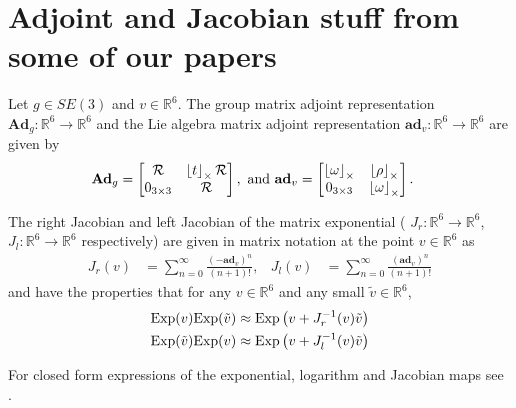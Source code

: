 \section{Adjoint and Jacobian stuff from some of our papers}

Let $g \in SE(3)$ and $v \in \mathbb{R}^6$. The group matrix adjoint representation $\mathbf{Ad}_{g}:\mathbb{R}^6 \to \mathbb{R}^6$ and the Lie algebra matrix adjoint representation $\mathbf{ad}_{v}:\mathbb{R}^{6}\to\mathbb{R}^{6}$ are given by 
\begin{align*}
\mathbf{Ad}_{g}&=\begin{bmatrix}\mathcal{R} & \ss{t}\mathcal{R}\\
0_{3\times3} & \mathcal{R}
\end{bmatrix}, \text{ and } \mathbf{ad}_{v}=\begin{bmatrix}\ss{\omega} & \ss{\rho}\\
0_{3\times3} & \ss{\omega}
\end{bmatrix}.
\end{align*}

The right Jacobian and left Jacobian of the matrix exponential (
$J_{r}:\mathbb{R}^{6}\to\mathbb{R}^{6}$, $J_{l}:\mathbb{R}^{6}\to\mathbb{R}^{6}$ respectively) are given
in matrix notation at the point $v \in{\mathbb{R}^6}$ as 
\begin{align} \label{eq:exponential_jacobians}
J_{r}\left(v\right) & =\sum_{n=0}^{\infty}\frac{\left(-\mathbf{ad}_{v}\right)^{n}}{\left(n+1\right)!}, & J_{l}\left(v\right) & =\sum_{n=0}^{\infty}\frac{\left(\mathbf{ad}_{v}\right)^{n}}{\left(n+1\right)!}
\end{align}
and have the properties that for any $v\in\mathbb{R}^6$ and any small $\tilde{v}\in\mathbb{R}^6$, 
\begin{subequations}\label{eq:Jacobian_property}
\begin{align}
\Exp(v)\Exp(\tilde{v}) & \approx\Exp\left(v+J_{r}^{-1}(v)\tilde{v}\right) \\
\Exp(\tilde{v})\Exp(v) & \approx\Exp\left(v+J_{l}^{-1}(v)\tilde{v}\right) 
\end{align}
\end{subequations}


For closed form expressions of the exponential, logarithm and Jacobian maps see \cite{Sola2018}.

